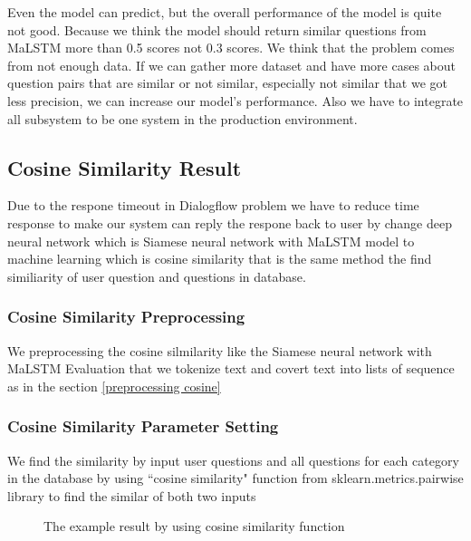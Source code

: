 \documentclass[12pt,oneside,openright,a4paper]{cpe-english-project}
\begin{document}
Even the model can predict, but the overall performance of the model is quite not good. Because we think the model should return similar questions from MaLSTM more than 0.5 scores not 0.3 scores. We think that the problem comes from not enough data. If we can gather more dataset and have more cases about question pairs that are similar or not similar, especially not similar that we got less precision, we can increase our model's performance. Also we have to integrate all subsystem to be one system in the production environment.

\subsection{Cosine Similarity Result}
\label{ch4_cosine_similarity_result}
Due to the respone timeout in Dialogflow problem we have to reduce time response to make our system can reply the respone back to user by change deep neural network which is Siamese neural network with MaLSTM model to machine learning which is cosine similarity that is the same method the find similiarity of user question and questions in database.
\subsubsection{Cosine Similarity Preprocessing}
We preprocessing the cosine silmilarity like the Siamese neural network with MaLSTM Evaluation that we tokenize
text and covert text into lists of sequence as in the section \ref*{preprocessing cosine}~
\subsubsection{Cosine Similarity Parameter Setting}
We find the similarity by input user questions and all questions for each category in the database by using ``cosine similarity" function from sklearn.metrics.pairwise library to find the similar of both two inputs
\begin{figure}[!h]\centering
{}
\caption{The example result by using cosine similarity function}\label{fig:cosine_result}
\end{figure}
\pagebreak
\end{document}
